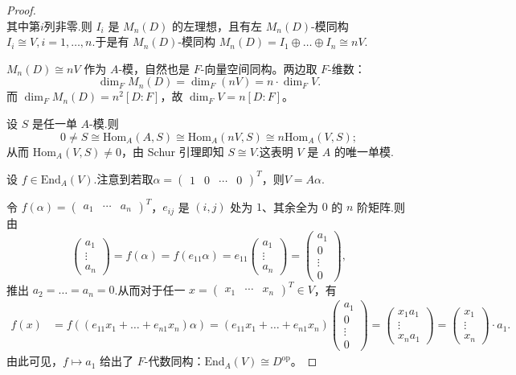 \documentclass[11pt,a4paper]{article}
\theoremstyle{plain}
\theoremstyle{definition}
\begin{document}
\begin{proof}
$$$$
其中第$i$列非零.则 $I_i$ 是 $M_n(D)$ 的左理想，且有左 $M_n(D)$-模同构 $I_i \cong V, i = 1, \dots, n$.于是有 $M_n(D)$-模同构 $M_n(D) = I_1 \oplus \dots \oplus I_n \cong nV$.\par
\noindent{} $M_n(D) \cong nV$ 作为 $A$-模，自然也是 $F$-向量空间同构。两边取 $F$-维数：
\[
\dim_F M_n(D) = \dim_F(nV) = n \cdot \dim_F V.
\]
而 $\dim_F M_n(D) = n^2 [D:F]$，故 $\dim_F V = n[D:F]$。\par
\noindent{} 设 $S$ 是任一单 $A$-模.则
$$
0 \neq S \cong \mathrm{Hom}_A(A, S) \cong \mathrm{Hom}_A(nV, S) \cong n\mathrm{Hom}_A(V, S);
$$
从而 $\mathrm{Hom}_A(V, S) \neq 0$，由 Schur 引理即知 $S \cong V$.这表明 $V$ 是 $A$ 的唯一单模.\par
\noindent{} 设 $f \in \mathrm{End}_A(V)$.注意到若取$\alpha=\begin{pmatrix}1& 0& \cdots & 0\end{pmatrix}^T$，则$V = A\alpha$.\par
令 $f(\alpha) = \begin{pmatrix} a_1 & \cdots & a_n \end{pmatrix}^T$，$e_{ij}$ 是 $(i, j)$ 处为 $1$、其余全为 $0$ 的 $n$ 阶矩阵.则由
$$
\begin{pmatrix} a_1 \\ \vdots \\ a_n \end{pmatrix}
= f(\alpha) = f(e_{11}\alpha) = e_{11} \begin{pmatrix} a_1 \\ \vdots \\ a_n \end{pmatrix}
= \begin{pmatrix} a_1 \\ 0 \\ \vdots \\ 0 \end{pmatrix},
$$
推出 $a_2 = \dots = a_n = 0$.从而对于任一 $x = \begin{pmatrix} x_1 & \cdots & x_n \end{pmatrix}^T \in V$，有
$$
\begin{aligned}
f(x) &= f((e_{11}x_1 + \dots + e_{n1}x_n)\alpha) = (e_{11}x_1 + \dots + e_{n1}x_n) \begin{pmatrix} a_1 \\ 0 \\ \vdots \\ 0 \end{pmatrix} = \begin{pmatrix} x_1 a_1 \\ \vdots \\ x_n a_1 \end{pmatrix}
= \begin{pmatrix} x_1 \\ \vdots \\ x_n \end{pmatrix} \cdot a_1.
\end{aligned}
$$
由此可见，$f \mapsto a_1$ 给出了 $F$-代数同构：$\mathrm{End}_A(V) \cong D^{\mathrm{op}}$。



\end{proof}
\end{document}
